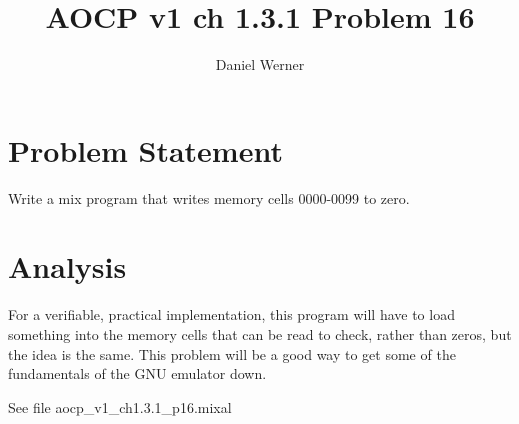 \documentclass{article}
\title{AOCP v1 ch 1.3.1 Problem 16}
\author{Daniel Werner}
\begin{document}
\maketitle

\section*{
    Problem Statement
}

Write a mix program that writes memory cells 0000-0099 to zero.

\section*{
    Analysis
}

For a verifiable, practical implementation, this program
 will have to load something into the memory cells that 
 can be read to check, rather than zeros, but the idea is
 the same.  This problem will be a good way to
 get some of the fundamentals of the GNU emulator down.

\par

 See file aocp\_v1\_ch1.3.1\_p16.mixal
\end{document}
